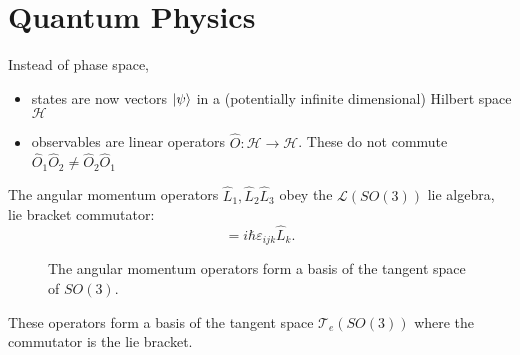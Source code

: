 \section{Quantum Physics}%
\label{sec:quantum_phyiscs}

Instead of phase space, 
\begin{itemize}
  \item states are now vectors $\ket{\psi}$ in a (potentially infinite dimensional) Hilbert space $\mathcal{H}$
  \item observables are linear operators $\hat O: \mathcal{H} \rightarrow \mathcal{H}$. These do not commute $\hat O_1 \hat O_2 \neq \hat O_2 \hat O_1$
\end{itemize}

The angular momentum operators $\hat L_1, \hat L_2 \hat L_3$ obey the $\mathscr{L}(SO(3))$ lie algebra, lie bracket commutator:
\begin{equation}
  [\hat L_i, \hat L_j] = i \hbar \varepsilon_{ijk} \hat L_k.
\end{equation}

\begin{figure}[htpb]
  \centering
  \def\svgwidth{0.3\columnwidth}
  
  \caption{The angular momentum operators form a basis of the tangent space of $SO(3)$.}
  \label{fig:so3}
\end{figure}

These operators form a basis of the tangent space $\mathcal{T}_e (SO(3))$ where the commutator is the lie bracket.

